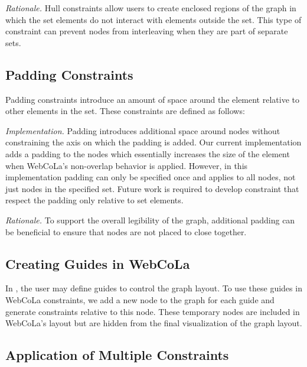 \emph{Rationale.}
Hull constraints allow users to create enclosed regions of the graph in
which the set elements do not interact with elements outside the set. This
type of constraint can prevent nodes from interleaving when they are part
of separate sets.


\subsection{Padding Constraints}

Padding constraints introduce an amount of space around the element relative
to other elements in the set. These constraints are defined as follows:


\emph{Implementation.}
Padding introduces additional space around nodes without constraining the
axis on which the padding is added. Our current implementation adds a
padding to the nodes which essentially increases the size of the element
when WebCoLa's non-overlap behavior is applied. However, in this implementation
padding can only be specified once and applies to all nodes, not just nodes
in the specified set. Future work is required to develop constraint that
respect the padding only relative to set elements.

\emph{Rationale.}
To support the overall legibility of the graph, additional padding can be
beneficial to ensure that nodes are not placed to close together.

\subsection{Creating Guides in WebCoLa}

In \projectname, the user may define guides to control the graph layout.
To use these guides in WebCoLa constraints, we add a new node to the graph
for each guide and generate constraints relative to this node. These 
temporary nodes are included in WebCoLa's layout but are hidden from the
final visualization of the graph layout.

\subsection{Application of Multiple Constraints}
